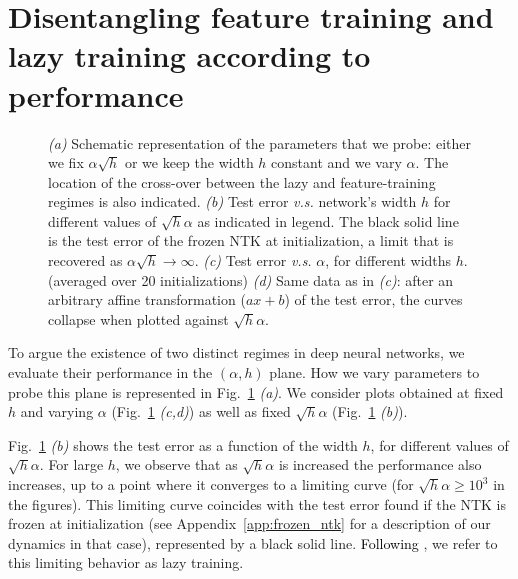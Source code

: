 \documentclass{article}
\newcommand{\mm}[1]{\textcolor{black}{#1}}
\renewcommand{\cite}[1]{\citep{#1}}
\newcommand{\aref}[1]{Appendix~\ref{#1}}
\newcommand{\fref}[1]{Fig.~\ref{#1}}
\begin{document}
\section{Disentangling feature training and lazy training according to  performance}\label{sec:tworegimes}
\begin{figure}[th]
    \centering
    \caption{\emph{(a)} Schematic representation of the parameters that we probe: either we fix $\alpha \sqrt{h}$ or we keep the width $h$ constant and we vary $\alpha$. The location of the cross-over between the lazy and feature-training regimes is also indicated. %
    \emph{(b)} Test error \textit{v.s.}  network's width $h$ for different values of $\sqrt{h} \alpha$ as indicated in legend. The black solid line is the test error of the frozen NTK at initialization, a limit that is recovered as $\alpha\sqrt{h}\to\infty$. \emph{(c)}
     Test error \textit{v.s.} $\alpha$, for different widths $h$. (averaged over 20 initializations) \emph{(d)} Same data as in \emph{(c)}: after an arbitrary affine transformation ($a x + b$) of the test error, the curves collapse when plotted against $\sqrt{h}\alpha$. 
     \label{fig:vary_alpha}}
\end{figure}

To argue the existence of two distinct regimes in deep neural networks, we evaluate their performance in the $(\alpha,h)$ plane. How we vary parameters to probe this plane  is represented in \fref{fig:vary_alpha} \emph{(a)}. We consider plots obtained at fixed $h$ and varying $\alpha$ (\fref{fig:vary_alpha} \emph{(c,d)}) as well as fixed $\sqrt{h}\alpha$ (\fref{fig:vary_alpha} \emph{(b)}).



\fref{fig:vary_alpha} \emph{(b)} shows the test error as a function of the width $h$, for different values of $\sqrt{h} \alpha$. For large $h$, we observe that as $\sqrt{h} \alpha$ is increased the performance also increases, up to a point where it converges to a limiting curve (for $\sqrt{h}\alpha\geq 10^3$ in the figures). This limiting curve coincides with the test error found if the NTK is frozen at initialization (see \aref{app:frozen_ntk} for a description of our dynamics in that case), represented by a black solid line. \mm{Following \cite{chizat19}}, we refer to this limiting behavior as lazy training. 
\end{document}
